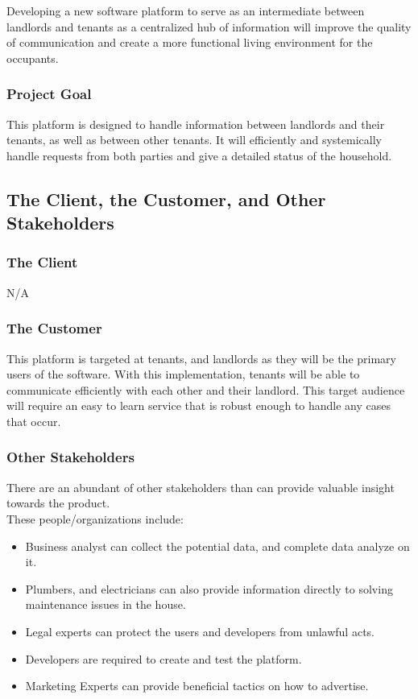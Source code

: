 \documentclass[12pt, titlepage]{article}
\begin{document}
Developing a new software platform to serve as an intermediate between 
landlords and tenants  as a centralized hub of information will improve 
the quality of communication and create a more functional living environment 
for the occupants.

\subsubsection{Project Goal}
This platform is designed to handle information between landlords and their 
tenants, as well as between other tenants. It will efficiently and systemically 
handle requests from both parties and give a detailed status of the household.

\subsection{The Client, the Customer, and Other Stakeholders}
\subsubsection {The Client}
  N/A
\subsubsection {The Customer}
This platform is targeted at tenants, and landlords as they will be the 
primary users of the software. With this implementation, tenants will be 
able to communicate efficiently with each other and their landlord. This target 
audience will require an easy to learn service that is robust enough to handle 
any cases that occur.
\subsubsection {Other Stakeholders}
There are an abundant of other stakeholders than can provide valuable insight 
towards the product. \\
These people/organizations include:\\
\begin{itemize}
\item Business analyst can collect the potential data, and complete data 
analyze on it.
\item Plumbers, and electricians can also provide information directly to 
solving maintenance issues in the house.
\item Legal experts can protect the users and developers from unlawful acts.
\item Developers are required to create and test the platform.
\item Marketing Experts can provide beneficial tactics on how to advertise.
\end{itemize}
\end{document}
